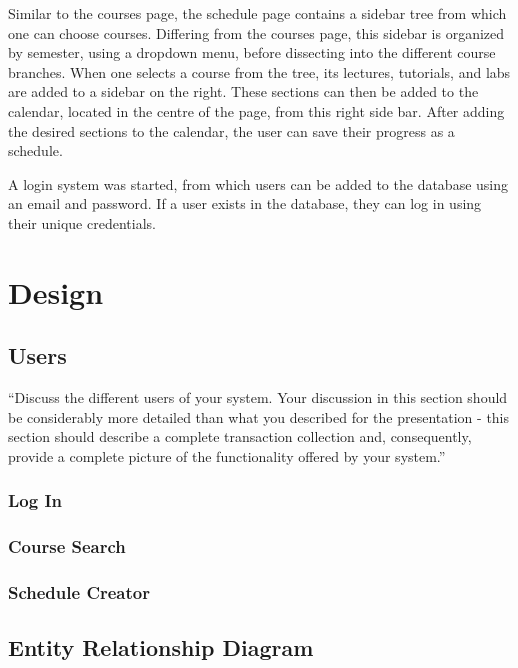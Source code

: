\documentclass[twoside=false,a4paper,11pt]{article}
\theoremstyle{mytheor}
\begin{document}
Similar to the courses page, the schedule page contains a sidebar tree from which one can choose courses. Differing from the courses page, this sidebar is organized by semester, using a dropdown menu, before dissecting into the different course branches. When one selects a course from the tree, its lectures, tutorials, and labs are added to a sidebar on the right. These sections can then be added to the calendar, located in the centre of the page, from this right side bar. After adding the desired sections to the calendar, the user can save their progress as a schedule.

A login system was started, from which users can be added to the database using an email and password. If a user exists in the database, they can log in using their unique credentials.

\section*{Design}

\subsection*{Users}

``Discuss the different users of your system. Your discussion in this section should be considerably more detailed than what you described for the presentation - this section should describe a complete transaction collection and, consequently, provide a complete picture of the functionality offered by your system.''

\subsubsection*{Log In}
\subsubsection*{Course Search}
\subsubsection*{Schedule Creator}

\subsection*{Entity Relationship Diagram}
\end{document}
